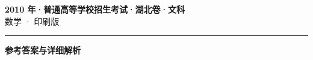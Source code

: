 \documentclass[zihao=5, a4paper]{ctexart}
\begin{document}
\begin{center}
  {\Large\bfseries 2010 年·普通高等学校招生考试·湖北卷·文科}\\[4pt]
  {\large 数学 · 印刷版}
\end{center}
\medskip
{}

\par\bigskip\hrule\bigskip
{}
\begin{center}{\large\bfseries 参考答案与详细解析}\end{center}
\smallskip

\end{document}
